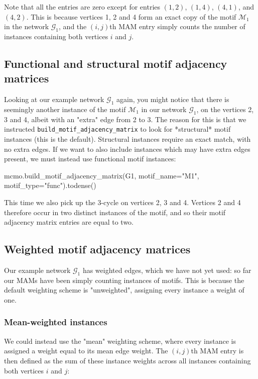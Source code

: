 \documentclass{article}
\begin{document}
Note that all the entries are zero except for entries
$(1,2)$,
$(1,4)$,
$(4,1)$,
and
$(4,2)$.
This is because vertices 1, 2 and 4 form an exact copy of
the motif $\mathcal{M}_1$ in the network $\mathcal{G}_1$,
and the  $(i,j)$th MAM entry simply counts the number of instances
containing both vertices $i$ and $j$.

\subsection{Functional and structural motif adjacency matrices}

Looking at our example network $\mathcal{G}_1$ again,
you might notice that there is seemingly another instance
of the motif $\mathcal{M}_1$
in our network $\mathcal{G}_1$,
on the vertices 2, 3 and 4,
albeit with an "extra" edge from 2 to 3.
The reason for this is that we instructed
\texttt{build\_motif\_adjacency\_matrix}
to look for *structural* motif instances (this is the default).
Structural instances require an exact match, with no extra edges.
If we want to also include instances which may have extra edges present,
we must instead use functional motif instances:


\begin{pyconsole}
mcmo.build_motif_adjacency_matrix(G1, motif_name="M1",
  motif_type="func").todense()
\end{pyconsole}

This time we also pick up the 3-cycle on vertices 2, 3 and 4.
Vertices 2 and 4 therefore occur in two distinct instances
of the motif, and so their motif adjacency matrix entries are equal
to two.

\subsection{Weighted motif adjacency matrices}

Our example network $\mathcal{G}_1$ has weighted edges,
which we have not yet used:
so far our MAMs have been simply counting
instances of motifs.
This is because the default weighting scheme is
"unweighted", assigning every instance a weight of one.

\subsubsection{Mean-weighted instances}

We could instead use the "mean" weighting scheme,
where every instance is assigned a weight equal to its
mean edge weight.
The $(i,j)$th MAM entry is then defined as the sum of these
instance weights across all instances containing
both vertices $i$ and $j$:
\end{document}
